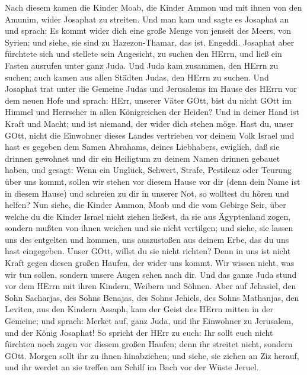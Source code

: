  Nach diesem kamen die Kinder Moab, die Kinder Ammon und mit
ihnen von den Amunim, wider Josaphat zu streiten.  Und man
kam und sagte es Josaphat an und sprach: Es kommt wider dich eine große
Menge von jenseit des Meers, von Syrien; und siehe, sie sind zu
Hazezon-Thamar, das ist, Engeddi.  Josaphat aber fürchtete
sich und stellete sein Angesicht, zu suchen den HErrn, und ließ ein
Fasten ausrufen unter ganz Juda.  Und Juda kam zusammen, den
HErrn zu suchen; auch kamen aus allen Städten Judas, den HErrn zu
suchen.  Und Josaphat trat unter die Gemeine Judas und
Jerusalems im Hause des HErrn vor dem neuen Hofe  und
sprach: HErr, unserer Väter GOtt, bist du nicht GOtt im Himmel und
Herrscher in allen Königreichen der Heiden? Und in deiner Hand ist Kraft
und Macht; und ist niemand, der wider dich stehen möge. 
Hast du, unser GOtt, nicht die Einwohner dieses Landes vertrieben vor
deinem Volk Israel und hast es gegeben dem Samen Abrahams, deines
Liebhabers, ewiglich,  daß sie drinnen gewohnet und dir ein
Heiligtum zu deinem Namen drinnen gebauet haben, und gesagt:
 Wenn ein Unglück, Schwert, Strafe, Pestilenz oder Teurung
über uns kommt, sollen wir stehen vor diesem Hause vor dir (denn dein
Name ist in diesem Hause) und schreien zu dir in unserer Not, so
wolltest du hören und helfen?  Nun siehe, die Kinder Ammon,
Moab und die vom Gebirge Seir, über welche du die Kinder Israel nicht
ziehen ließest, da sie aus Ägyptenland zogen, sondern mußten von ihnen
weichen und sie nicht vertilgen;  und siehe, sie lassen uns
des entgelten und kommen, uns auszustoßen aus deinem Erbe, das du uns
hast eingegeben.  Unser GOtt, willst du sie nicht richten?
Denn in uns ist nicht Kraft gegen diesen großen Haufen, der wider uns
kommt. Wir wissen nicht, was wir tun sollen, sondern unsere Augen sehen
nach dir.  Und das ganze Juda stund vor dem HErrn mit ihren
Kindern, Weibern und Söhnen.  Aber auf Jehasiel, den Sohn
Sacharjas, des Sohns Benajas, des Sohns Jehiels, des Sohns Mathanjas,
den Leviten, aus den Kindern Assaph, kam der Geist des HErrn mitten in
der Gemeine;  und sprach: Merket auf, ganz Juda, und ihr
Einwohner zu Jerusalem, und der König Josaphat! So spricht der HErr zu
euch: Ihr sollt euch nicht fürchten noch zagen vor diesem großen Haufen;
denn ihr streitet nicht, sondern GOtt.  Morgen sollt ihr zu
ihnen hinabziehen; und siehe, sie ziehen an Ziz herauf, und ihr werdet
an sie treffen am Schilf im Bach vor der Wüste Jeruel. 
